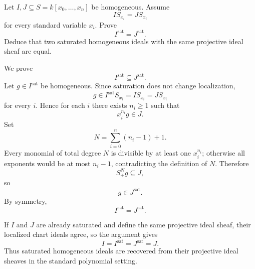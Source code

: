 \begin{problem}\label{prob:vi37-14}
Let \(I,J\subseteq S=k[x_0,\ldots,x_n]\) be homogeneous. Assume
\[
IS_{x_i}=JS_{x_i}
\]
for every standard variable \(x_i\). Prove
\[
I^{\mathrm{sat}}=J^{\mathrm{sat}}.
\]
Deduce that two saturated homogeneous ideals with the same projective ideal sheaf are equal.

\end{problem}

\ifdefined\FullProblemDossiers
\begin{solution}
We prove
\[
I^{\mathrm{sat}}\subseteq J^{\mathrm{sat}}.
\]
Let \(g\in I^{\mathrm{sat}}\) be homogeneous. Since saturation does not change localization,
\[
g\in I^{\mathrm{sat}}S_{x_i}=IS_{x_i}=JS_{x_i}
\]
for every \(i\). Hence for each \(i\) there exists \(n_i\ge1\) such that
\[
x_i^{n_i}g\in J.
\]
Set
\[
N=\sum_{i=0}^n(n_i-1)+1.
\]
Every monomial of total degree \(N\) is divisible by at least one \(x_i^{n_i}\); otherwise all exponents would be at most \(n_i-1\), contradicting the definition of \(N\). Therefore
\[
S_+^Ng\subseteq J,
\]
so
\[
g\in J^{\mathrm{sat}}.
\]
By symmetry,
\[
\boxed{I^{\mathrm{sat}}=J^{\mathrm{sat}}}.
\]

If \(I\) and \(J\) are already saturated and define the same projective ideal sheaf, their localized chart ideals agree, so the argument gives
\[
I=I^{\mathrm{sat}}=J^{\mathrm{sat}}=J.
\]
Thus saturated homogeneous ideals are recovered from their projective ideal sheaves in the standard polynomial setting.
\end{solution}
\fi
